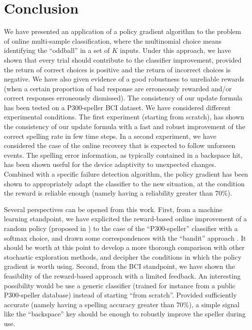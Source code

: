 \documentclass[conference]{IEEEtran}
\begin{document}
\section{Conclusion}

We have presented an application of a policy gradient algorithm 
to the problem of online multi-sample classification, where the multinomial choice means identifying 
the ``oddball'' in a set of $K$ inputs. 
Under this approach, we have shown that every trial should contribute to the classifier improvement, 
provided the return of correct choices is positive and the return of incorrect choices is negative.
We have also given evidence of a good robustness to unreliable rewards 
(when a certain proportion of bad response are erroneously rewarded and/or correct responses 
erroneously dismissed). 
The consistency of our update formula 
has been tested on a P300-speller BCI dataset.
We have considered different experimental conditions. The first experiment (starting from scratch),
has shown the consistency of our update formula with a fast and robust improvement of the 
correct spelling rate in few time steps.
In a second experiment, we have considered the case of the online recovery that is expected to follow 
unforseen events. 
The spelling error information, as typically contained in a backspace hit, has been shown useful for the device adaptivity to unexpected changes. 
Combined with a specific failure detection algorithm, the policy gradient has been shown to appropriately
adapt the classifier to the new situation, at the condition 
the reward is reliable enough (namely having a reliability greater than 70\%).


Several perspectives can be opened from this work. First, from a machine learning standpoint, we have
explicited the reward-based online improvement of a random policy (proposed in \cite{Wil92}) to the case of the ``P300-speller'' classifier
with a softmax choice, and drawn 
some correspondences with the ``bandit'' approach \cite{Auer02}. It should be worth at this point to develop a
more thorough comparison with other stochastic exploration methods, and decipher the conditions in which the policy gradient 
is worth using. 
Second, from the BCI standpoint, we have shown the feasibility 
of the reward-based approach with a limited feedback.
An interesting possibility would be use a generic classifier (trained for instance from a public P300-speller database) instead of starting
``from scratch''. Provided sufficiently accurate (namely having a spelling accuracy greater than 70\%), a
simple signal like the ``backspace'' key should be enough to robustly improve the speller during use.  
\end{document}
